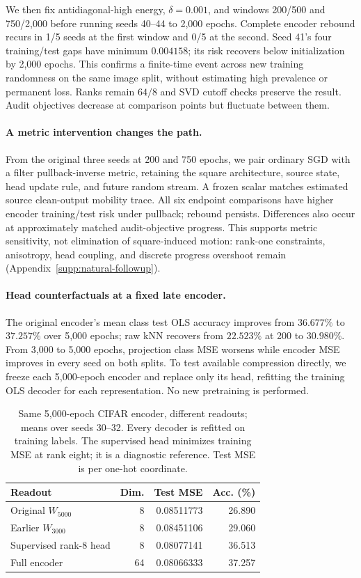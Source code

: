 We then fix antidiagonal-high energy, $\delta=0.001$, and windows 200/500 and 750/2,000 before running seeds 40--44 to 2,000 epochs. Complete encoder rebound recurs in 1/5 seeds at the first window and 0/5 at the second. Seed 41's four training/test gaps have minimum $0.004158$; its risk recovers below initialization by 2,000 epochs. This confirms a finite-time event across new training randomness on the same image split, without estimating high prevalence or permanent loss. Ranks remain $64/8$ and SVD cutoff checks preserve the result. Audit objectives decrease at comparison points but fluctuate between them.

\paragraph{A metric intervention changes the path.}
From the original three seeds at 200 and 750 epochs, we pair ordinary SGD with a filter pullback-inverse metric, retaining the square architecture, source state, head update rule, and future random stream. A frozen scalar matches estimated source clean-output mobility trace. All six endpoint comparisons have higher encoder training/test risk under pullback; rebound persists. Differences also occur at approximately matched audit-objective progress. This supports metric sensitivity, not elimination of square-induced motion: rank-one constraints, anisotropy, head coupling, and discrete progress overshoot remain (Appendix~\ref{supp:natural-followup}).

\paragraph{Head counterfactuals at a fixed late encoder.}
The original encoder's mean class test OLS accuracy improves from $36.677\%$ to $37.257\%$ over 5,000 epochs; raw kNN recovers from $22.523\%$ at 200 to $30.980\%$. From 3,000 to 5,000 epochs, projection class MSE worsens while encoder MSE improves in every seed on both splits. To test available compression directly, we freeze each 5,000-epoch encoder and replace only its head, refitting the training OLS decoder for each representation. No new pretraining is performed.

\begin{table}[t]
\centering\small
\caption{Same 5,000-epoch CIFAR encoder, different readouts; means over seeds 30--32. Every decoder is refitted on training labels. The supervised head minimizes training MSE at rank eight; it is a diagnostic reference. Test MSE is per one-hot coordinate.}
\label{main:natural}
\setlength{\tabcolsep}{3pt}
\begin{tabular}{lrrr}
\toprule
Readout&Dim.&Test MSE&Acc. (\%)\\\midrule
Original $W_{5000}$&8&0.08511773&26.890\\
Earlier $W_{3000}$&8&0.08451106&29.060\\
Supervised rank-8 head&8&0.08077141&36.513\\
Full encoder&64&0.08066333&37.257\\\bottomrule
\end{tabular}
\end{table}

